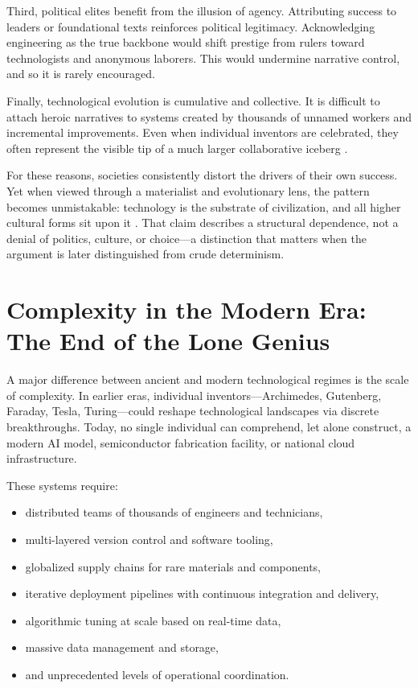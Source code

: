 \documentclass[12pt,letterpaper]{article}
\begin{document}
Third, political elites benefit from the illusion of agency. Attributing success to leaders or foundational texts reinforces political legitimacy. Acknowledging engineering as the true backbone would shift prestige from rulers toward technologists and anonymous laborers. This would undermine narrative control, and so it is rarely encouraged.

Finally, technological evolution is cumulative and collective. It is difficult to attach heroic narratives to systems created by thousands of unnamed workers and incremental improvements. Even when individual inventors are celebrated, they often represent the visible tip of a much larger collaborative iceberg \cite{kelly2010}.

For these reasons, societies consistently distort the drivers of their own success. Yet when viewed through a materialist and evolutionary lens, the pattern becomes unmistakable: technology is the substrate of civilization, and all higher cultural forms sit upon it \cite{arthur2009}. That claim describes a structural dependence, not a denial of politics, culture, or choice---a distinction that matters when the argument is later distinguished from crude determinism.

\section{Complexity in the Modern Era: The End of the Lone Genius}
\label{sec:complexity}

A major difference between ancient and modern technological regimes is the scale of complexity. In earlier eras, individual inventors---Archimedes, Gutenberg, Faraday, Tesla, Turing---could reshape technological landscapes via discrete breakthroughs. Today, no single individual can comprehend, let alone construct, a modern AI model, semiconductor fabrication facility, or national cloud infrastructure.

These systems require:
\begin{itemize}
  \item distributed teams of thousands of engineers and technicians,
  \item multi-layered version control and software tooling,
  \item globalized supply chains for rare materials and components,
  \item iterative deployment pipelines with continuous integration and delivery,
  \item algorithmic tuning at scale based on real-time data,
  \item massive data management and storage,
  \item and unprecedented levels of operational coordination.
\end{itemize}
\end{document}
